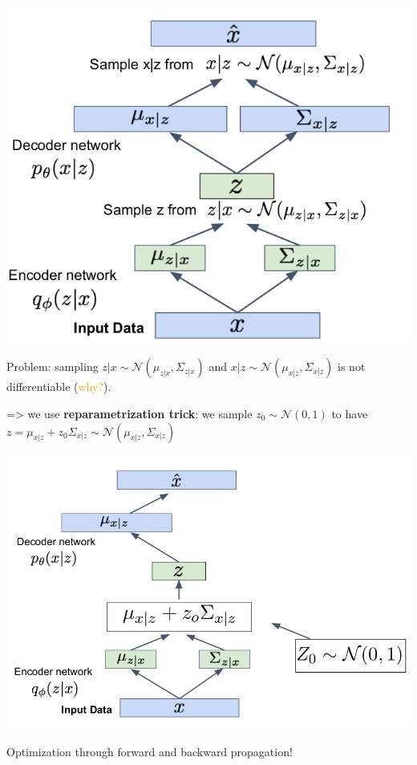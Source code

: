 \begin{center}
\includegraphics[scale=0.4]{VAE_final_schema.png}
\end{center}

Problem: sampling $z | x \sim \mathcal{N}(\mu_{z | x}, \Sigma_{z | x})$ and $x | z \sim \mathcal{N}(\mu_{x | z}, \Sigma_{x | z})$ is not differentiable (\textcolor{orange}{why?}).

=> we use \textbf{reparametrization trick}: we sample $z_0 \sim \mathcal{N}(0,1)$ to have $z = \mu_{x | z} + z_0 \Sigma_{x | z} \sim \mathcal{N}(\mu_{x | z}, \Sigma_{x | z})$

\begin{center}
\includegraphics[scale=0.4]{VAE_reparametrization_trick.png}
\end{center}

Optimization through forward and backward propagation!